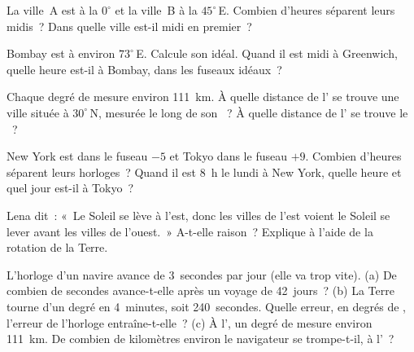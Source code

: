 \begin{exercise}[$\star\star$]\label{exo:g6:latitude-longitude:6}
La ville~A est à la  $0^\circ$ et la ville~B à la 
$45^\circ$\,E. Combien d'heures séparent leurs midis~? Dans quelle ville
est-il midi en premier~?
\end{exercise}

\begin{exercise}[$\star\star$]\label{exo:g6:latitude-longitude:7}
Bombay est à environ $73^\circ$\,E. Calcule son  idéal.
Quand il est midi à Greenwich, quelle heure est-il à Bombay, dans les
fuseaux idéaux~?
\end{exercise}

\begin{exercise}[$\star\star$]\label{exo:g6:latitude-longitude:8}
Chaque degré de  mesure environ \qty{111}{km}. À quelle distance
de l' se trouve une ville située à $30^\circ$\,N, mesurée le long
de son ~? À quelle distance de l' se trouve le ~?
\end{exercise}

\begin{exercise}[$\star\star$]\label{exo:g6:latitude-longitude:9}
New York est dans le fuseau $-5$ et Tokyo dans le fuseau $+9$. Combien
d'heures séparent leurs horloges~? Quand il est 8~h le lundi à New York,
quelle heure et quel jour est-il à Tokyo~?
\end{exercise}

\begin{exercise}[$\star\star$]\label{exo:g6:latitude-longitude:10}
Lena dit~: «~Le Soleil se lève à l'est, donc les villes de l'est voient le
Soleil se lever avant les villes de l'ouest.~» A-t-elle raison~? Explique
à l'aide de la rotation de la Terre.
\end{exercise}

\begin{exercise}[$\star\star\star$]\label{exo:g6:latitude-longitude:11}
L'horloge d'un navire avance de 3~secondes par jour (elle va trop vite).
(a) De combien de secondes avance-t-elle après un voyage de 42~jours~?
(b) La Terre tourne d'un degré en 4~minutes, soit 240~secondes. Quelle
erreur, en degrés de , l'erreur de l'horloge entraîne-t-elle~?
(c) À l', un degré de  mesure environ \qty{111}{km}. De
combien de kilomètres environ le navigateur se trompe-t-il, à l'~?
\end{exercise}

